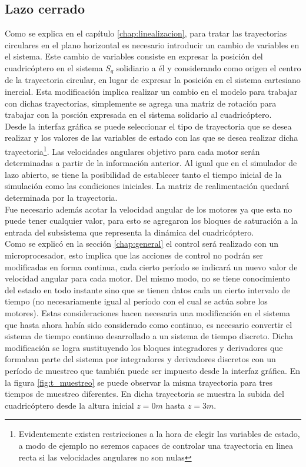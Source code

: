 \documentclass[main]{subfiles}
\begin{document}
\subsection{Lazo cerrado}

Como se explica en el cap\'itulo \ref{chap:linealizacion}, para tratar las trayectorias circulares en el plano horizontal es necesario introducir un cambio de variables en el sistema. Este cambio de variables consiste en expresar la posici\'on del cuadric\'optero en el sistema $S_q$ solidiario a \'el y considerando como origen el centro de la trayectoria circular, en lugar de expresar la posici\'on en el sistema cartesiano inercial. Esta modificaci\'on implica realizar un cambio en el modelo para trabajar con dichas trayectorias, simplemente se agrega una matriz de rotaci\'on para trabajar con la posci\'on expresada en el sistema solidario al cuadric\'optero.\\ 

Desde la interfaz gr\'afica se puede seleccionar el tipo de trayectoria que se desea realizar y los valores de las variables de estado con las que se desea realizar dicha trayectoria\footnote{Evidentemente existen restricciones a la hora de elegir las variables de estado, a modo de ejemplo no seremos capaces de controlar una trayectoria en linea recta si las velocidades angulares no son nulas}. Las velocidades angulares objetivo para cada motor ser\'an determinadas a partir de la informaci\'on anterior. Al igual que en el simulador de lazo abierto, se tiene la posibilidad de establecer tanto el tiempo inicial de la simulaci\'on como las condiciones iniciales. La matriz de realimentaci\'on quedar\'a determinada por la trayectoria.\\

Fue necesario adem\'as acotar la velocidad angular de los motores ya que esta no puede tener cualquier valor, para esto se agregaron los bloques de saturaci\'on a la entrada del subsistema que representa la din\'amica del cuadric\'optero.\\

Como se explic\'o en la secci\'on \ref{chap:general} el control ser\'a realizado con un microprocesador, esto implica que las acciones de control no podr\'an ser modificadas en forma continua, cada cierto per\'iodo se indicar\'a un nuevo valor de velocidad angular para cada motor. Del mismo modo, no se tiene conocimiento del estado en todo instante sino que se tienen datos cada un cierto intervalo de tiempo (no necesariamente igual al per\'iodo con el cual se act\'ua sobre los motores). Estas consideraciones hacen necesaria una modificaci\'on en el sistema que hasta ahora hab\'ia sido considerado como continuo, es necesario convertir el sistema de tiempo continuo desarrollado a un sistema de tiempo discreto. Dicha modificaci\'on se logra sustituyendo los bloques integradores y derivadores que formaban parte del sistema por integradores y derivadores discretos con un per\'iodo de muestreo que tambi\'en puede ser impuesto desde la interfaz gr\'afica. En la figura \ref{fig:t_muestreo} se puede observar la misma trayectoria para tres tiempos de muestreo diferentes. En dicha trayectoria se muestra la subida del cuadric\'optero desde la altura inicial $z=0m$ hasta $z=3m$. 
 
\end{document}
